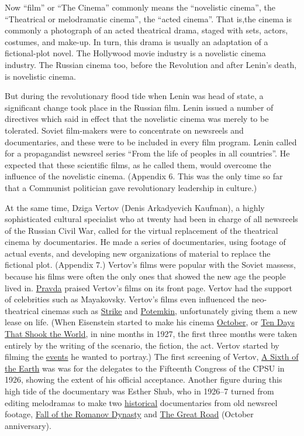 Now \enquote{film} or \enquote{The Cinema} commonly means the \enquote{novelistic cinema},
the \enquote{Theatrical or melodramatic cinema}, the \enquote{acted cinema}. 
That is,the cinema is commonly a photograph of an acted theatrical
drama, staged with sets, actors, costumes, and make-up. In
turn, this drama is usually an adaptation of a fictional-plot novel. 
The Hollywood movie industry is a novelistic cinema industry. The
Russian cinema too, before the Revolution and after Lenin's death, 
is novelistic cinema. 

But during the revolutionary flood tide when Lenin was head of
state, a significant change took place in the Russian film. Lenin
issued a number of directives which said in effect that the novelistic
cinema was merely to be tolerated. Soviet film-makers were 
to concentrate on newsreels and documentaries, and these were 
to be included in every film program. Lenin called for a propagandist 
newsreel series \enquote{From the life of peoples in all countries}.
He expected that these scientific films, as he called them, would 
overcome the influence of the novelistic cinema. (Appendix 6. This
was the only time so far that a Communist politician gave revolutionary 
leadership in culture.) 

At the same time, Dziga Vertov (Denis Arkadyevich Kaufman), a
highly sophisticated cultural specialist who at twenty had been 
in charge of all newsreels of the Russian Civil War, called for the 
virtual replacement of the theatrical cinema by documentaries. He 
made a series of documentaries, using footage of actual events,
and developing new organizations of material to replace the fictional plot. (Appendix 7.)
Vertov's films were popular with the 
Soviet massess, because his films were often the only ones that
showed the new age the people lived in. \uline{Pravda} praised Vertov's
films on its front page. Vertov had the support of celebrities such
as Mayakovsky. Vertov's films even influenced the neo-theatrical
cinemas such as \uline{Strike} and \uline{Potemkin}, unfortunately giving them a 
new lease on life. (When Eisenstein started to make his cinema
\uline{October}, or \uline{Ten Days That Shook the World}, in nine months in
1927, the first three months were taken entirely by the writing of 
the scenario, the fiction, the act. Vertov started by filming the
\uline{events} he wanted to portray.) The first screening of Vertov, \uline{A Sixth
of the Earth} was was for the delegates to the Fifteenth Congress of the
CPSU in 1926, showing the extent of his official acceptance.
Another figure during this high tide of the documentary was Esther 
Shub, who in 1926--7 turned from editing melodramas to make two 
\uline{historical} documentaries from old newsreel footage, \uline{Fall of the
Romanov Dynasty} and \uline{The Great Road} (October anniversary). 

